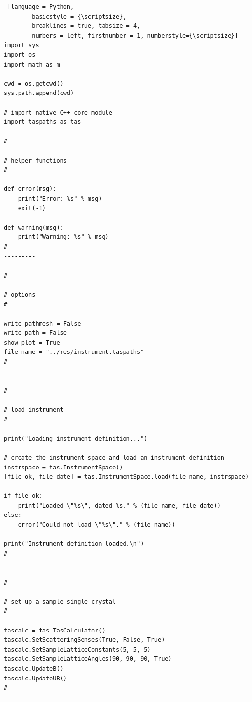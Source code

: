 \begin{listing}[htb]
	\begin{lstlisting} [language = Python, 
		basicstyle = {\scriptsize},
		breaklines = true, tabsize = 4,
		numbers = left, firstnumber = 1, numberstyle={\scriptsize}]
import sys
import os
import math as m

cwd = os.getcwd()
sys.path.append(cwd)

# import native C++ core module
import taspaths as tas

# -----------------------------------------------------------------------------
# helper functions
# -----------------------------------------------------------------------------
def error(msg):
	print("Error: %s" % msg)
	exit(-1)

def warning(msg):
	print("Warning: %s" % msg)
# -----------------------------------------------------------------------------

# -----------------------------------------------------------------------------
# options
# -----------------------------------------------------------------------------
write_pathmesh = False
write_path = False
show_plot = True
file_name = "../res/instrument.taspaths"
# -----------------------------------------------------------------------------

# -----------------------------------------------------------------------------
# load instrument
# -----------------------------------------------------------------------------
print("Loading instrument definition...")

# create the instrument space and load an instrument definition
instrspace = tas.InstrumentSpace()
[file_ok, file_date] = tas.InstrumentSpace.load(file_name, instrspace)

if file_ok:
	print("Loaded \"%s\", dated %s." % (file_name, file_date))
else:
	error("Could not load \"%s\"." % (file_name))

print("Instrument definition loaded.\n")
# -----------------------------------------------------------------------------

# -----------------------------------------------------------------------------
# set-up a sample single-crystal
# -----------------------------------------------------------------------------
tascalc = tas.TasCalculator()
tascalc.SetScatteringSenses(True, False, True)
tascalc.SetSampleLatticeConstants(5, 5, 5)
tascalc.SetSampleLatticeAngles(90, 90, 90, True)
tascalc.UpdateB()
tascalc.UpdateUB()
# -----------------------------------------------------------------------------
	\end{lstlisting}
	\caption[Python workflow example 1/3.]{Script showing an example workflow in \textit{Python}.
	Part 1 of 3: Set-up of the instrument and the sample crystal.
	\label{lst:pyworkflow1}}
\end{listing}



